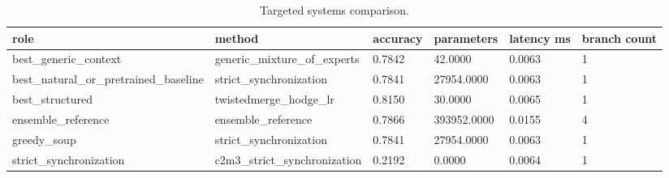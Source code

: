 \begin{table}[t]
\centering
\caption{Targeted systems comparison.}
\begin{tabular}{llllll}
\toprule
role & method & accuracy & parameters & latency ms & branch count \\
\midrule
best\_generic\_context & generic\_mixture\_of\_experts & 0.7842 & 42.0000 & 0.0063 & 1 \\
best\_natural\_or\_pretrained\_baseline & strict\_synchronization & 0.7841 & 27954.0000 & 0.0063 & 1 \\
best\_structured & twistedmerge\_hodge\_lr & 0.8150 & 30.0000 & 0.0065 & 1 \\
ensemble\_reference & ensemble\_reference & 0.7866 & 393952.0000 & 0.0155 & 4 \\
greedy\_soup & strict\_synchronization & 0.7841 & 27954.0000 & 0.0063 & 1 \\
strict\_synchronization & c2m3\_strict\_synchronization & 0.2192 & 0.0000 & 0.0064 & 1 \\
\bottomrule
\end{tabular}
\end{table}
